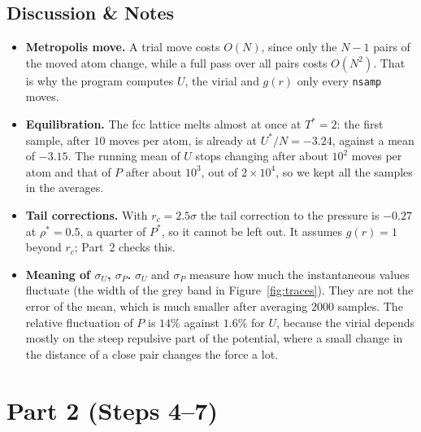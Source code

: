 \subsection{Discussion \& Notes}
\begin{itemize}
  \item \textbf{Metropolis move.} A trial move costs $O(N)$, since only the $N-1$ pairs of the moved atom change, while a full pass over all pairs costs $O(N^2)$. That is why the program computes $U$, the virial and $g(r)$ only every \texttt{nsamp} moves.

  \item \textbf{Equilibration.} The fcc lattice melts almost at once at $T^*=2$: the first sample, after $10$ moves per atom, is already at $U^*/N=-3.24$, against a mean of $-3.15$. The running mean of $U$ stops changing after about $10^2$ moves per atom and that of $P$ after about $10^3$, out of $2\times10^4$, so we kept all the samples in the averages.

  \item \textbf{Tail corrections.} With $r_c=2.5\sigma$ the tail correction to the pressure is $-0.27$ at $\rho^*=0.5$, a quarter of $P^*$, so it cannot be left out. It assumes $g(r)=1$ beyond $r_c$; Part~2 checks this.

  \item \textbf{Meaning of $\sigma_U$, $\sigma_P$.} $\sigma_U$ and $\sigma_P$ measure how much the instantaneous values fluctuate (the width of the grey band in Figure~\ref{fig:traces}). They are not the error of the mean, which is much smaller after averaging $2000$ samples. The relative fluctuation of $P$ is $14\%$ against $1.6\%$ for $U$, because the virial depends mostly on the steep repulsive part of the potential, where a small change in the distance of a close pair changes the force a lot.
\end{itemize}

\newpage
\section{Part 2 (Steps 4--7)}

